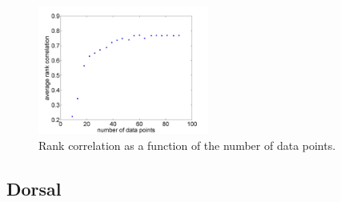 \documentclass[11pt]{article}
\begin{document}
\begin{figure}[h]
\centering
\includegraphics[width=0.5\textwidth]{bootstrap_rank_corr}
\caption{Rank correlation as a function of the number of data points.}
\label{fig:bootstrap}
\end{figure}

\subsection{Dorsal}
\end{document}
